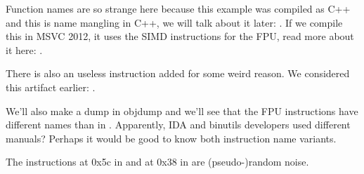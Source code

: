 Function names are so strange here because this example was compiled as C++ and this is name mangling in C++,
we will talk about it later: .
If we compile this in MSVC 2012, it uses the SIMD instructions for the FPU, read more about it here: .




There is also an useless  instruction added for some weird reason.
We considered this artifact earlier: .





We'll also make a dump in objdump and we'll see that the FPU instructions have different names than in \IDA.
Apparently, IDA and binutils developers used different manuals?
Perhaps it would be good to know both instruction name variants.



The instructions at 0x5c in  and at 0x38 in \main are (pseudo-)random noise.

